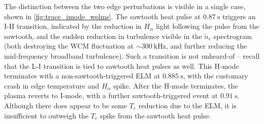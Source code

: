 The distinction between the two edge perturbations is visible in a single case, shown in \cref{fig:trace_imode_welms}.  The sawtooth heat pulse at $\SI{0.87}{\second}$ triggers an I-H transition, indicated by the reduction in $H_\alpha$ light following the pulse from the sawtooth, and the sudden reduction in turbulence visible in the $\tilde{n}_e$ spectrogram (both destroying the WCM fluctuation at $\sim \SI{300}{\kilo\hertz}$, and further reducing the mid-frequency broadband turbulence).  Such a transition is not unheard-of -- recall that the L-I transition is tied to sawtooth heat pulses as well.  This H-mode terminates with a non-sawtooth-triggered ELM at $\SI{0.885}{\second}$, with the customary crash in edge temperature and $H_\alpha$ spike.  After the H-mode terminates, the plasma reverts to I-mode, with a further sawtooth-triggered event at $\SI{0.91}{\second}$.  Although there does appear to be some $T_e$ reduction due to the ELM, it is insufficient to outweigh the $T_e$ spike from the sawtooth heat pulse.

\begin{figure}[t]
 \pushtooutside
\end{figure}

